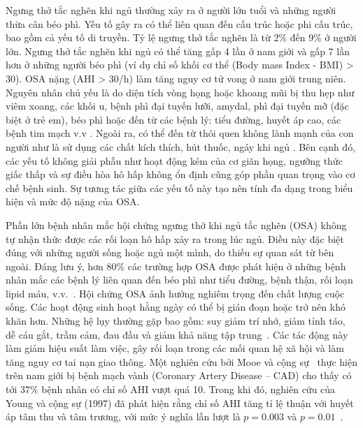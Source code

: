 Ngưng thở tắc nghẽn khi ngủ thường xảy ra ở người lớn tuổi và những người thừa cân béo phì. 
Yếu tố gây ra có thể liên quan đến cấu trúc hoặc phi cấu trúc, bao gồm cả yếu tố di truyền. 
Tỷ lệ ngưng thở tắc nghẽn là từ 2\% đến 9\% ở người lớn. 
Ngưng thở tắc nghẽn khi ngủ có thể tăng gấp 4 lần ở nam giới và gấp 7 lần hơn ở những người béo phì (ví dụ chỉ số khối cơ thể (Body mass Index - BMI) > 30). 
OSA nặng (AHI > 30/h) làm tăng nguy cơ tử vong ở nam giới trung niên.
Nguyên nhân chủ yếu là do diện tích vòng họng hoặc khoang mũi bị thu hẹp như viêm xoang, 
các khối u, bệnh phì đại tuyến lưỡi, amydal, phì đại tuyến mỡ (đặc biệt ở trẻ em), 
béo phì hoặc đến từ các bệnh lý: tiểu đường, huyết áp cao, các bệnh tim mạch v.v \cite{wright1997health}. 
Ngoài ra, có thể đến từ thói quen không lành mạnh của con người như là sử dụng các chất kích thích, hút thuốc, ngáy khi ngủ \cite{reason_osa}\cite{reasonOsa}. 
Bên cạnh đó, các yếu tố không giải phẫu như hoạt động kém của cơ giãn họng, ngưỡng thức giấc thấp và sự điều hòa hô hấp không ổn định cũng góp phần quan trọng vào cơ chế bệnh sinh. 
Sự tương tác giữa các yếu tố này tạo nên tính đa dạng trong biểu hiện và mức độ nặng của OSA.



Phần lớn bệnh nhân mắc hội chứng ngưng thở khi ngủ tắc nghẽn (\gls{OSA}) không tự nhận thức được các rối loạn hô hấp xảy ra trong lúc ngủ. Điều này đặc biệt đúng với những người sống hoặc ngủ một mình, do thiếu sự quan sát từ bên ngoài. Đáng lưu ý, hơn 80\% các trường hợp OSA được phát hiện ở những bệnh nhân mắc các bệnh lý liên quan đến béo phì như tiểu đường, bệnh thận, rối loạn lipid máu, v.v.~\cite{wright1997health}.
Hội chứng OSA ảnh hưởng nghiêm trọng đến chất lượng cuộc sống. Các hoạt động sinh hoạt hằng ngày có thể bị gián đoạn hoặc trở nên khó khăn hơn. Những hệ lụy thường gặp bao gồm: suy giảm trí nhớ, giảm tỉnh táo, dễ cáu gắt, trầm cảm, đau đầu và giảm khả năng tập trung~\cite{flemons1997quality}. Các tác động này làm giảm hiệu suất làm việc, gây rối loạn trong các mối quan hệ xã hội và làm tăng nguy cơ tai nạn giao thông.
Một nghiên cứu bởi Mooe và cộng sự~\cite{mooe1996sleep} thực hiện trên nam giới bị bệnh mạch vành (Coronary Artery Disease – CAD) cho thấy có tới 37\% bệnh nhân có chỉ số AHI vượt quá 10. Trong khi đó, nghiên cứu của Young và cộng sự (1997) đã phát hiện rằng chỉ số AHI tăng tỉ lệ thuận với huyết áp tâm thu và tâm trương, với mức ý nghĩa lần lượt là $p=0.003$ và $p=0.01$~\cite{young1997population}.

